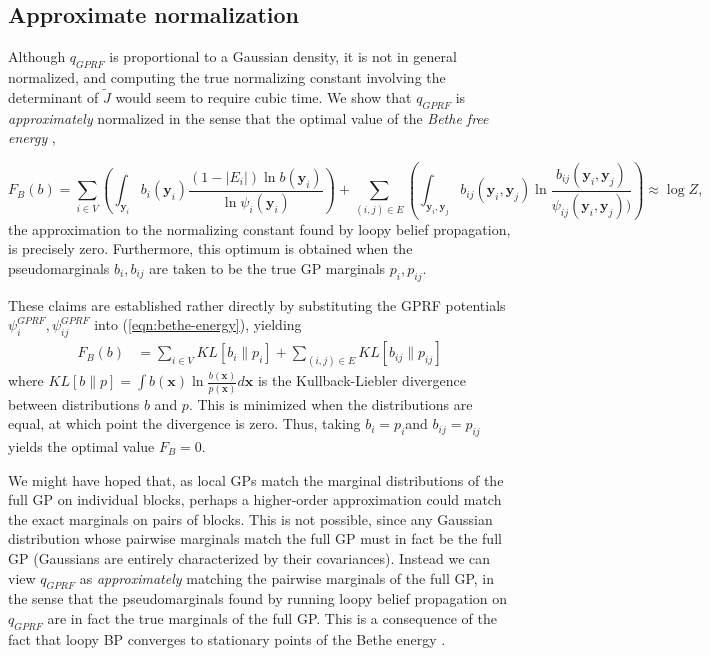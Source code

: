 \documentclass{article}
\renewcommand{\v}[1]{\mathbf{#1}}
\begin{document}

\subsection{Approximate normalization}
\label{sec:approx-norm}

Although $q_{GPRF}$ is proportional to a Gaussian density, it is not
in general normalized, and computing the true normalizing constant involving the determinant of $\tilde{J}$ would seem to require
cubic time. We show
that $q_{GPRF}$ is {\em approximately} normalized in the sense that
the optimal value of the {\em Bethe free energy} \cite{yedidia2001bethe}, 

\begin{equation}
F_B(b) = \sum_{i\in V} \left(\int_{\v{y}_i} b_i(\v{y}_i) \frac{(1-|E_i|)\ln
    b(\v{y}_i)}{\ln \psi_i(\v{y}_i)}\right)  + \sum_{(i,j)\in E} \left(\int_{\v{y}_i, \v{y}_j} b_{ij}(\v{y}_i,
  \v{y}_j) \ln \frac{b_{ij}(\v{y}_i,
  \v{y}_j)}{\psi_{ij}(\v{y}_i, \v{y}_j))}\right)
\label{eqn:bethe-energy} \approx \log Z,
\end{equation}
the approximation to the normalizing constant found by loopy belief
propagation, is precisely zero. Furthermore, this
optimum is obtained when the pseudomarginals $b_i, b_{ij}$ are
taken to be the true GP marginals $p_i, p_{ij}$. 

These claims are established rather directly by substituting the GPRF potentials
$\psi_i^{GPRF}, \psi_{ij}^{GPRF}$ into (\ref{eqn:bethe-energy}), yielding
\begin{align}
F_B(b)&= \sum_{i\in V} KL[b_i \| p_i] + \sum_{(i,j)\in E} KL[b_{ij}\| p_{ij}]
\end{align}
where $KL[b\|p] = \int b(\v{x}) \ln \frac{b(\v{x})}{p(\v{x})}d\v{x}$
is the Kullback-Liebler divergence between distributions $b$ and
$p$.  This is minimized when the distributions are equal, at which
point the divergence is zero. Thus, taking $b_i=p_i$and
$b_{ij}=p_{ij}$ yields the optimal value $F_B=0$.

We might have hoped that, as local GPs match the marginal
distributions of the full GP on individual blocks, perhaps a
higher-order approximation could match the exact marginals on pairs of
blocks. This is not possible, since any Gaussian distribution whose
pairwise marginals match the full GP must in fact be the full GP
(Gaussians are entirely characterized by their covariances). Instead we
can view $q_{GPRF}$ as {\em approximately} matching the pairwise
marginals of the full GP, in the sense that the pseudomarginals found
by running loopy belief propagation on $q_{GPRF}$ are in fact the true
marginals of the full GP. This is a consequence of the fact that loopy
BP converges to stationary points of the Bethe energy
\cite{yedidia2001bethe}.
\end{document}
